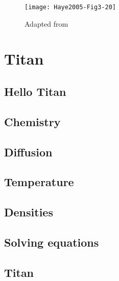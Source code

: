 \documentclass{report}
\begin{document}
\tableofcontents

\begin{figure}
\centering
\texttt{[image: Haye2005-Fig3-20]}
\caption{Adapted from \cite{Haye2005}}
\end{figure}

\part{Titan}
\chapter{Hello Titan}


\chapter{Chemistry}


\chapter{Diffusion}


\chapter{Temperature}


\chapter{Densities}


\chapter{Solving equations}


\appendix
\chapter{Titan}

\clearpage


\end{document}
